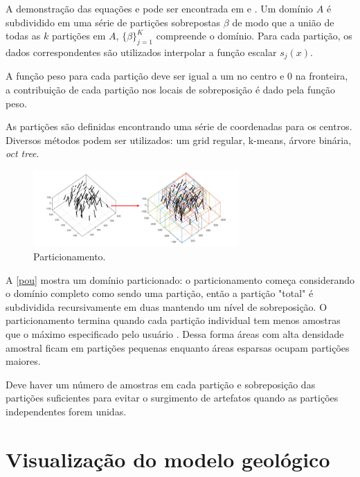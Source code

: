 A demonstração das equações e pode ser encontrada em  e . Um domínio $A$ é subdividido em uma série de partições sobrepostas $\beta$ de modo que a união de todas as $k$ partições em $A$, $\{ \beta \}^K_{j=1}$ compreende o domínio. Para cada partição, os dados correspondentes são utilizados interpolar a função escalar $s_j(x)$.

A função peso para cada partição deve ser igual a um no centro e 0 na fronteira, a contribuição de cada partição nos locais de sobreposição é dado pela função peso.

As partições são definidas encontrando uma série de coordenadas para os centros. Diversos métodos podem ser utilizados: um grid regular, k-means, árvore binária, \textit{oct tree}.

\begin{figure}[H]
	\caption{\label{pou}Particionamento.}
	\begin{center}
		\includegraphics[width=0.7\textwidth]{capitulo_2/pou.jpg}
	\end{center}
\end{figure}

A \autoref{pou} mostra um domínio particionado: o particionamento começa considerando o domínio completo como sendo uma partição, então a partição "total" é subdividida recursivamente em duas mantendo um nível de sobreposição. O particionamento termina quando cada partição individual tem menos amostras que o máximo especificado pelo usuário \cite{martin2017implicitmodeling}. Dessa forma áreas com alta densidade amostral ficam em partições pequenas enquanto áreas esparsas ocupam partições maiores.

Deve haver um número de amostras em cada partição e sobreposição das partições suficientes para evitar o surgimento de artefatos quando as partições independentes forem unidas.

\section{Visualização do modelo geológico}

